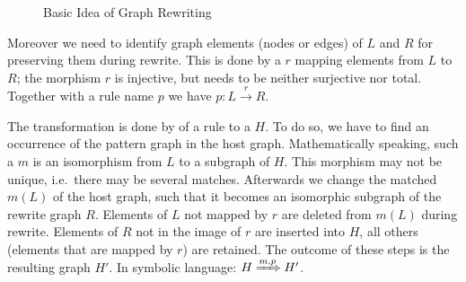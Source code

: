 \begin{figure}[htbp]
	\centering
  \caption{Basic Idea of Graph Rewriting}
  \label{figrule}
\end{figure}

Moreover we need to identify graph elements (nodes or edges) of $L$ and $R$ for preserving them during rewrite.
This is done by a  $r$ mapping elements from $L$ to $R$; the morphism $r$ is injective, but needs to be neither surjective nor total.
Together with a rule name $p$ we have $p : L \xrightarrow{r} R$.

The transformation is done by  of a rule to a  $H$.
To do so, we have to find an occurrence of the pattern graph in the host graph.
Mathematically speaking, such a  $m$ is an isomorphism from $L$ to a subgraph of $H$.
This morphism may not be unique, i.e.\ there may be several matches.
Afterwards we change the matched  $m(L)$ of the host graph, such that it becomes an isomorphic subgraph of the rewrite graph $R$.
Elements of $L$ not mapped by $r$ are deleted from $m(L)$ during rewrite.
Elements of $R$ not in the image of $r$ are inserted into $H$, all others (elements that are mapped by $r$) are retained.
The outcome of these steps is the resulting graph $H'$. In symbolic language: $H \xRightarrow{m, p} H'$.


